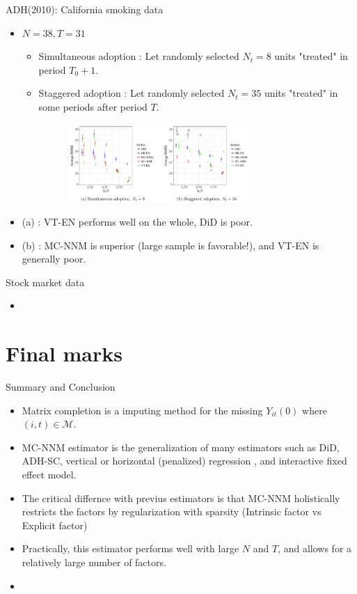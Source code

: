 \documentclass[xcolor=svgnames,aspectratio=169]{beamer}
\begin{document}
\begin{frame}{ADH(2010): California smoking data}
    \begin{itemize}
        \item $N=38, T=31$
        \begin{itemize}
            \item Simultaneous adoption : Let randomly selected $N_t=8$ units "treated" in period $T_0+1$.
            \item Staggered adoption : Let randomly selected $N_t=35$ units "treated" in some periods after period $T$.
            \begin{figure}
            \includegraphics[width=0.7\textwidth, height=0.4\textheight, keepaspectratio]{ADH.png}
            \end{figure}
        \end{itemize}
        \item (a) : VT-EN performs well on the whole, DiD is poor.
        \item (b) : MC-NNM is superior (large sample is favorable!), and VT-EN is generally poor.
    \end{itemize}
\end{frame}

\begin{frame}{Stock market data}
    \begin{itemize}
        \item 
    \end{itemize}
\end{frame}

\section{Final marks}

\begin{frame}{Summary and Conclusion}
    \begin{itemize}
        \item Matrix completion is a imputing method for the missing $Y_{it}(0)$ where $(i,t)\in \mathcal{M}$.
        \item MC-NNM estimator is the generalization of many estimators such as DiD, ADH-SC, vertical or horizontal (penalized) regression , and interactive fixed effect model.
        \item The critical differnce with previus estimators is that MC-NNM \alert{holistically restricts} the factors by regularization with sparsity (Intrinsic factor vs Explicit factor)
        \item Practically, this estimator performs well with large $N$ and $T$, and allows for a relatively large number of factors.
        \item 
    \end{itemize}
\end{frame}
\end{document}
